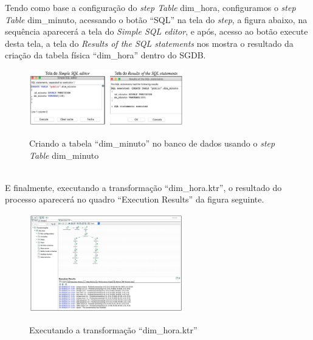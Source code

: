 Tendo como base a configura\c{c}\~{a}o do \textit{step Table} dim\_hora, configuramos o \textit{step Table} dim\_minuto, 
acessando o bot\~{a}o ``SQL'' na tela do \textit{step}, a figura abaixo, na sequência aparecer\'{a} a tela do \textit{Simple 
SQL editor}, e ap\'{o}s, acesso ao bot\~{a}o execute desta tela, a tela do \textit{Results of the SQL statements} 
nos mostra o resultado da cria\c{c}\~{a}o da tabela f\'{i}sica ``dim\_hora'' dentro do SGDB. 

\begin{figure}[H]
	\vspace*{0,2cm}
    \centering
    \caption{Criando a tabela ``dim\_minuto'' no banco de dados usando o \textit{step Table} dim\_minuto}
    \includegraphics[width=0.6\textwidth]{./04-figuras/figura-tb-dim-minuto}
    \label{fig:ilustfigtbdimminuto}
\end{figure}
\vspace*{-0,9cm}
{\raggedright {}} \\

E finalmente, executando a transforma\c{c}\~{a}o ``dim\_hora.ktr'', o resultado do 
processo aparecer\'{a} no quadro ``Execution Results'' da figura seguinte.

\begin{figure}[H]
	\vspace*{0,2cm}
    \centering
    \caption{Executando a transforma\c{c}\~{a}o ``dim\_hora.ktr''}
    \includegraphics[width=0.6\textwidth]{./04-figuras/figura-exec-dim-hora}
    \label{fig:ilustfigexecdimhora}
\end{figure}
\vspace*{-0,9cm}
{\raggedright {}} \\

